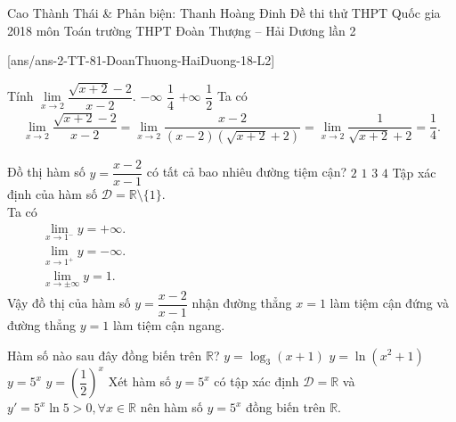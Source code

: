 \begin{name}
{Cao Thành Thái \& Phản biện: Thanh Hoàng Đinh}
{Đề thi thử THPT Quốc gia 2018 môn Toán trường THPT Đoàn Thượng – Hải Dương lần 2}
\end{name}
\setcounter{ex}{0}\setcounter{bt}{0}
[ans/ans-2-TT-81-DoanThuong-HaiDuong-18-L2]


\begin{ex}%
 Tính $\lim\limits_{x\to 2}\dfrac{\sqrt{x+2}-2}{x-2}$.
 \choice
  {$-\infty$}
  {\True $\dfrac{1}{4}$}
  {$+\infty$}
  {$\dfrac{1}{2}$}
 \loigiai
  {
  Ta có
  \begin{eqnarray*}
   \lim\limits_{x\to 2}\dfrac{\sqrt{x+2}-2}{x-2} = \lim\limits_{x\to 2} \dfrac{x-2}{(x-2)\left(\sqrt{x+2}+2\right)}=\lim\limits_{x\to 2}\dfrac{1}{\sqrt{x+2}+2}=\dfrac{1}{4}.
  \end{eqnarray*}
  }
\end{ex}

\begin{ex}%
 Đồ thị hàm số $y=\dfrac{x-2}{x-1}$ có tất cả bao nhiêu đường tiệm cận?
 \choice
  {\True $2$}
  {$1$}
  {$3$}
  {$4$}
 \loigiai
  {
  Tập xác định của hàm số $\mathscr{D}=\mathbb{R}\setminus\{1\}$.\\
  Ta có\\
  $\begin{aligned}
   && &\lim\limits_{x\to 1^-}y=+\infty.\\
   && &\lim\limits_{x\to 1^+}y=-\infty.\\
   && &\lim\limits_{x\to\pm\infty}y=1.
  \end{aligned}$\\
  Vậy đồ thị của hàm số $y=\dfrac{x-2}{x-1}$ nhận đường thẳng $x=1$ làm tiệm cận đứng và đường thẳng $y=1$ làm tiệm cận ngang.
  }
\end{ex}

\begin{ex}%
 Hàm số nào sau đây đồng biến trên $\mathbb{R}$?
 \choice
  {$y=\log_3 (x+1)$}
  {$y=\ln\left(x^2+1\right)$}
  {\True $y=5^x$}
  {$y=\left(\dfrac{1}{2}\right)^x$}
 \loigiai
  {
  Xét hàm số $y=5^x$ có tập xác định $\mathscr{D}=\mathbb{R}$ và $y'=5^x\ln 5 >0, \forall x\in\mathbb{R}$ nên hàm số $y=5^x$ đồng biến trên $\mathbb{R}$.
  }
\end{ex}


